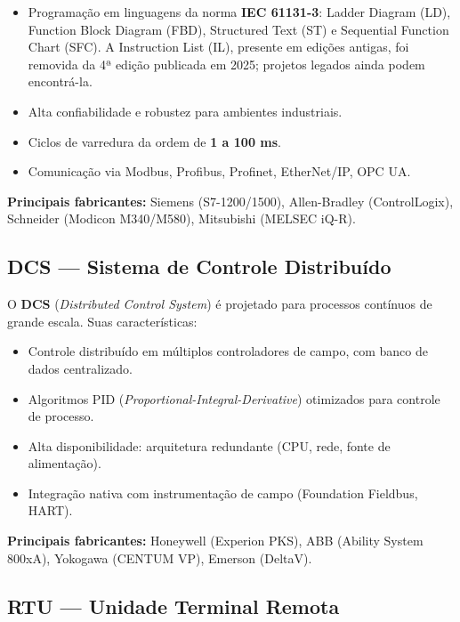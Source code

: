 \begin{itemize}
\tightlist
\item
  Programação em linguagens da norma \textbf{IEC 61131-3}: Ladder Diagram (LD), Function Block Diagram (FBD), Structured Text (ST) e Sequential Function Chart (SFC). A Instruction List (IL), presente em edições antigas, foi removida da 4ª edição publicada em 2025; projetos legados ainda podem encontrá-la.
\item
  Alta confiabilidade e robustez para ambientes industriais.
\item
  Ciclos de varredura da ordem de \textbf{1 a 100 ms}.
\item
  Comunicação via Modbus, Profibus, Profinet, EtherNet/IP, OPC UA.
\end{itemize}

\textbf{Principais fabricantes:} Siemens (S7-1200/1500), Allen-Bradley (ControlLogix), Schneider (Modicon M340/M580), Mitsubishi (MELSEC iQ-R).

\subsection{\texorpdfstring{DCS --- Sistema de Controle Distribuído}{DCS  Sistema de Controle Distribuído}}\label{dcs-sistema-de-controle-distribuuxeddo}

O \textbf{DCS} (\emph{Distributed Control System}) é projetado para processos contínuos de grande escala. Suas características:

\begin{itemize}
\tightlist
\item
  Controle distribuído em múltiplos controladores de campo, com banco de dados centralizado.
\item
  Algoritmos PID (\emph{Proportional-Integral-Derivative}) otimizados para controle de processo.
\item
  Alta disponibilidade: arquitetura redundante (CPU, rede, fonte de alimentação).
\item
  Integração nativa com instrumentação de campo (Foundation Fieldbus, HART).
\end{itemize}

\textbf{Principais fabricantes:} Honeywell (Experion PKS), ABB (Ability System 800xA), Yokogawa (CENTUM VP), Emerson (DeltaV).

\subsection{\texorpdfstring{RTU --- Unidade Terminal Remota}{RTU  Unidade Terminal Remota}}\label{rtu-unidade-terminal-remota}

